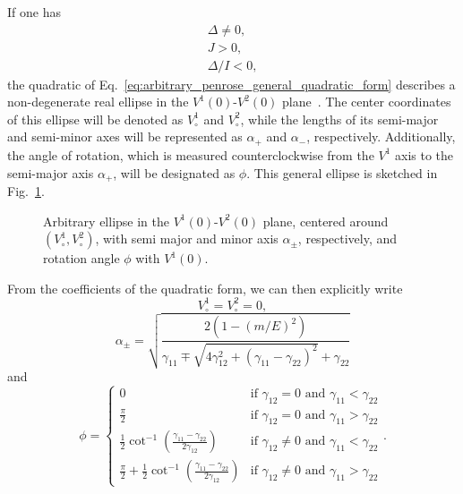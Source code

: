 If one has
%
\begin{align}
  \Delta \neq 0, \\
  J > 0,         \\
  \Delta / I < 0,
\end{align}
%
the quadratic of Eq.~\eqref{eq:arbitrary_penrose_general_quadratic_form} describes a non-degenerate real ellipse in the $V^1(0)$-$V^2(0)$ plane~\cite{Hart2002}. The center coordinates of this ellipse will be denoted as $V^1_\circ$ and $V^2_\circ$, while the lengths of its semi-major and semi-minor axes will be represented as $\alpha_+$ and $\alpha_-$, respectively. Additionally, the angle of rotation, which is measured counterclockwise from the $V^1$ axis to the semi-major axis $\alpha_+$, will be designated as $\phi$. This general ellipse is sketched in Fig.~\ref{fig:arbitrary_penrose_ellipse}.

\begin{figure}[!ht]
  \centering
  
  \caption{Arbitrary ellipse in the $V^1(0)$-$V^2(0)$ plane, centered around $\left(V^1_\circ,V^2_\circ\right)$, with semi major and minor axis $\alpha_\pm$, respectively, and rotation angle $\phi$ with $V^1(0)$.}
  \label{fig:arbitrary_penrose_ellipse}
\end{figure}

From the coefficients of the quadratic form, we can then explicitly write~\cite{Larson2006, Young2010, Lawrence2014}
%
\begin{equation}
  V^1_\circ = V^2_\circ = 0,
  \label{eq:arbitrary_penrose_ellipse_centers}
\end{equation}
%
\begin{equation}
  \alpha_\pm = \sqrt{ \frac{2 \left( 1 - \left(m/E\right)^2 \right)}{\gamma_{11} \mp \sqrt{4 \gamma_{12}^2 + \left( \gamma_{11} - \gamma_{22} \right)^2} +\gamma_{22}} }
  \label{eq:arbitrary_penrose_ellipse_axis}
\end{equation}
%
and
\begin{equation}
  \phi =
  \begin{cases}
    0                                                                                                 & \text{if } \gamma_{12} = 0 \text{ and } \gamma_{11} < \gamma_{22}    \\
    \frac{\pi}{2}                                                                                     & \text{if } \gamma_{12} = 0 \text{ and } \gamma_{11} > \gamma_{22}    \\
    \frac{1}{2} \cot^{-1} \left( \frac{\gamma_{11}-\gamma_{22}}{2\gamma_{12}} \right)                 & \text{if } \gamma_{12} \neq 0 \text{ and } \gamma_{11} < \gamma_{22} \\
    \frac{\pi}{2} + \frac{1}{2} \cot^{-1} \left( \frac{\gamma_{11}-\gamma_{22}}{2\gamma_{12}} \right) & \text{if } \gamma_{12} \neq 0 \text{ and } \gamma_{11} > \gamma_{22}
  \end{cases}
  .
  \label{eq:arbitrary_penrose_ellipse_angle}
\end{equation}

